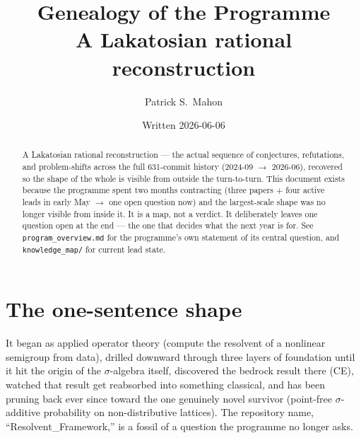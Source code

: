 \documentclass[11pt]{article}
\title{Genealogy of the Programme\\
\large A Lakatosian rational reconstruction}
\author{Patrick S.\ Mahon}
\date{Written 2026-06-06}
\begin{document}
\maketitle

\begin{abstract}
\noindent
A Lakatosian rational reconstruction --- the actual sequence of conjectures,
refutations, and problem-shifts across the full 631-commit history
(2024-09 $\to$ 2026-06), recovered so the shape of the whole is visible from
outside the turn-to-turn. This document exists because the programme spent two
months contracting (three papers $+$ four active leads in early May $\to$ one
open question now) and the largest-scale shape was no longer visible from inside
it. It is a map, not a verdict. It deliberately leaves one question open at the
end --- the one that decides what the next year is for. See
\texttt{program\_overview.md} for the programme's own statement of its central
question, and \texttt{knowledge\_map/} for current lead state.
\end{abstract}

\medskip\noindent{}

\tableofcontents

\section{The one-sentence shape}

It began as applied operator theory (compute the resolvent of a nonlinear
semigroup from data), drilled downward through three layers of foundation until
it hit the origin of the $\sigma$-algebra itself, discovered the bedrock result
there (CE), watched that result get reabsorbed into something classical, and has
been pruning back ever since toward the one genuinely novel survivor (point-free
$\sigma$-additive probability on non-distributive lattices). The repository name,
``Resolvent\_Framework,'' is a fossil of a question the programme no longer asks.
\end{document}
